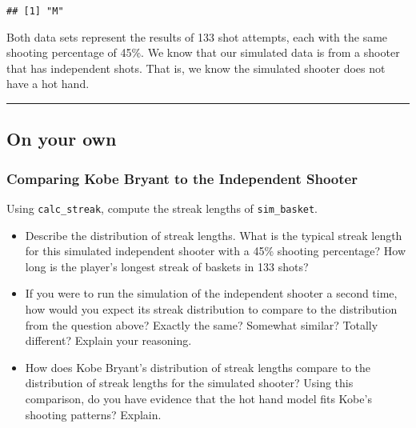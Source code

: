 \documentclass[
]{article}
\begin{document}
\begin{verbatim}
## [1] "M"
\end{verbatim}

Both data sets represent the results of 133 shot attempts, each with the
same shooting percentage of 45\%. We know that our simulated data is
from a shooter that has independent shots. That is, we know the
simulated shooter does not have a hot hand.

\begin{center}\rule{0.5\linewidth}{0.5pt}\end{center}

\hypertarget{on-your-own}{%
\subsection{On your own}\label{on-your-own}}

\hypertarget{comparing-kobe-bryant-to-the-independent-shooter}{%
\subsubsection{Comparing Kobe Bryant to the Independent
Shooter}\label{comparing-kobe-bryant-to-the-independent-shooter}}

Using \texttt{calc\_streak}, compute the streak lengths of
\texttt{sim\_basket}.

\begin{itemize}
\item
  Describe the distribution of streak lengths. What is the typical
  streak length for this simulated independent shooter with a 45\%
  shooting percentage? How long is the player's longest streak of
  baskets in 133 shots?
\item
  If you were to run the simulation of the independent shooter a second
  time, how would you expect its streak distribution to compare to the
  distribution from the question above? Exactly the same? Somewhat
  similar? Totally different? Explain your reasoning.
\item
  How does Kobe Bryant's distribution of streak lengths compare to the
  distribution of streak lengths for the simulated shooter? Using this
  comparison, do you have evidence that the hot hand model fits Kobe's
  shooting patterns? Explain.
\end{itemize}
\end{document}
